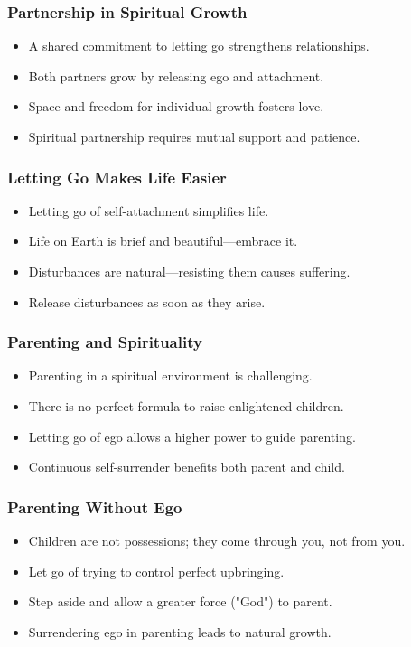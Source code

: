 \begin{frame}[fragile]\frametitle{Partnership in Spiritual Growth}
  \begin{itemize}
    \item A shared commitment to letting go strengthens relationships.
    \item Both partners grow by releasing ego and attachment.
    \item Space and freedom for individual growth fosters love.
    \item Spiritual partnership requires mutual support and patience.
  \end{itemize}
\end{frame}

\begin{frame}[fragile]\frametitle{Letting Go Makes Life Easier}
  \begin{itemize}
    \item Letting go of self-attachment simplifies life.
    \item Life on Earth is brief and beautiful—embrace it.
    \item Disturbances are natural—resisting them causes suffering.
    \item Release disturbances as soon as they arise.
  \end{itemize}
\end{frame}

\begin{frame}[fragile]\frametitle{Parenting and Spirituality}
  \begin{itemize}
    \item Parenting in a spiritual environment is challenging.
    \item There is no perfect formula to raise enlightened children.
    \item Letting go of ego allows a higher power to guide parenting.
    \item Continuous self-surrender benefits both parent and child.
  \end{itemize}
\end{frame}

\begin{frame}[fragile]\frametitle{Parenting Without Ego}
  \begin{itemize}
    \item Children are not possessions; they come through you, not from you.
    \item Let go of trying to control perfect upbringing.
    \item Step aside and allow a greater force ("God") to parent.
    \item Surrendering ego in parenting leads to natural growth.
  \end{itemize}
\end{frame}

